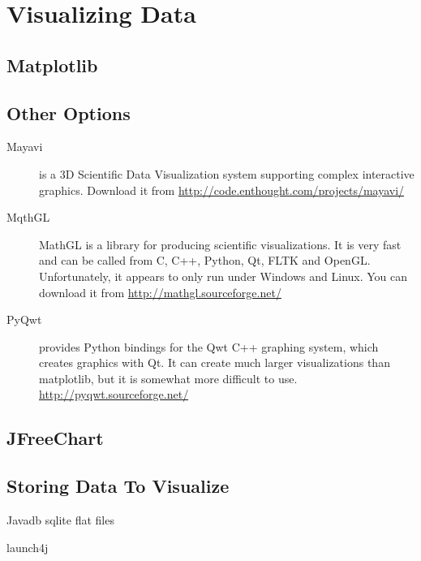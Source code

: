 \chapter{Visualizing Data}
\section{Matplotlib}

\section{Other Options}
\begin{description}
\item[Mayavi] is a 3D Scientific Data Visualization system supporting
  complex interactive graphics. Download it from \url{http://code.enthought.com/projects/mayavi/}
\item[MqthGL] MathGL is a library for producing scientific
  visualizations. It is very fast and can be called from C, C++,
  Python, Qt, FLTK and OpenGL. Unfortunately, it appears to only run
  under Windows and Linux. You can download it from \url{http://mathgl.sourceforge.net/}
\item[PyQwt] provides Python bindings for the Qwt C++ graphing system,
  which creates graphics with Qt. It can create much larger
  visualizations than matplotlib, but it is somewhat more difficult to
  use. \url{http://pyqwt.sourceforge.net/}
\end{description}

\section{JFreeChart}
\section{Storing Data To Visualize}
Javadb
sqlite
flat files

launch4j


